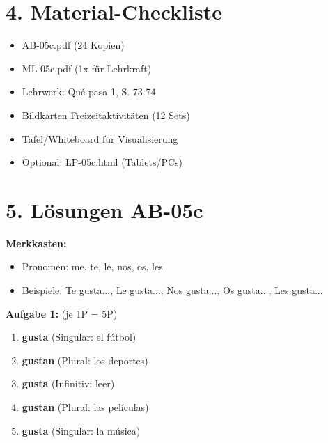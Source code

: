 \documentclass[11pt, a4paper]{article}
\newcommand{\loesung}[1]{\textcolor{loesung}{\textbf{#1}}}
\begin{document}

\section*{4. Material-Checkliste}

\begin{materialbox}
\begin{itemize}[label=$\square$]
    \item AB-05c.pdf (24 Kopien)
    \item ML-05c.pdf (1x für Lehrkraft)
    \item Lehrwerk: Qué pasa 1, S. 73-74
    \item Bildkarten Freizeitaktivitäten (12 Sets)
    \item Tafel/Whiteboard für Visualisierung
    \item Optional: LP-05c.html (Tablets/PCs)
\end{itemize}
\end{materialbox}


\section*{5. Lösungen AB-05c}

\textbf{Merkkasten:}
\begin{itemize}
    \item Pronomen: me, te, le, nos, os, les
    \item Beispiele: Te gusta..., Le gusta..., Nos gusta..., Os gusta..., Les gusta...
\end{itemize}

\vspace{0.5em}

\textbf{Aufgabe 1:} (je 1P = 5P)
\begin{enumerate}[label=\alph*)]
    \item \loesung{gusta} (Singular: el fútbol)
    \item \loesung{gustan} (Plural: los deportes)
    \item \loesung{gusta} (Infinitiv: leer)
    \item \loesung{gustan} (Plural: las películas)
    \item \loesung{gusta} (Singular: la música)
\end{enumerate}
\end{document}
